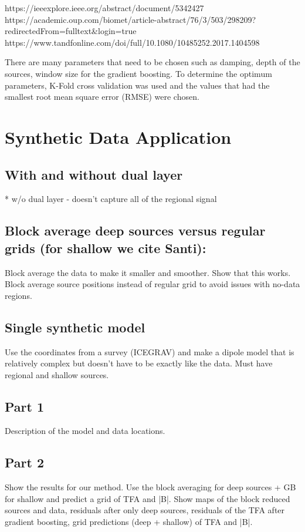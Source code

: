 https://ieeexplore.ieee.org/abstract/document/5342427
https://academic.oup.com/biomet/article-abstract/76/3/503/298209?redirectedFrom=fulltext&login=true
https://www.tandfonline.com/doi/full/10.1080/10485252.2017.1404598


There are many parameters that need to be chosen such as damping, depth of the sources, window size for the gradient boosting. To determine the optimum parameters, K-Fold cross validation was used and the values that had the smallest root mean square error (RMSE) were chosen.

\section{Synthetic Data Application}

\subsection{With and without dual layer}
* w/o dual layer - doesn't capture all of the regional signal

\subsection{Block average deep sources versus regular grids (for shallow we cite Santi):}
Block average the data to make it smaller and smoother. Show that this works.
Block average source positions instead of regular grid to avoid issues with no-data regions.

\subsection{Single synthetic model}
Use the coordinates from a survey (ICEGRAV) and make a dipole model that is relatively complex but doesn't have to be exactly like the data. Must have regional and shallow sources.


\subsection{Part 1}
Description of the model and data locations.

\subsection{Part 2}
Show the results for our method. Use the block averaging for deep sources + GB for shallow and predict a grid of TFA and |B|. Show maps of the block reduced sources and data, residuals after only deep sources, residuals of the TFA after gradient boosting, grid predictions (deep + shallow) of TFA and |B|.

